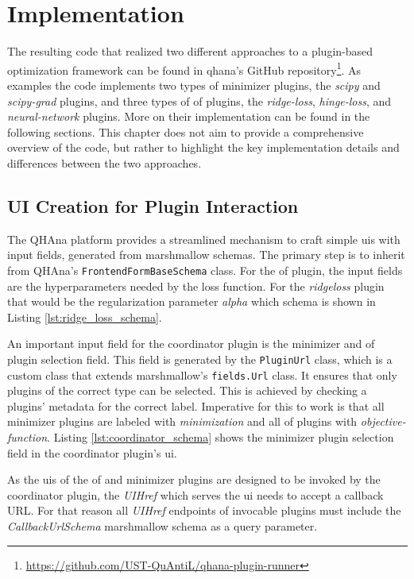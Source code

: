 \documentclass[
  a4paper,  %
  twoside,  %
  bibliography=totoc,
  headsepline,
  cleardoublepage=empty,
  parskip=half,
  draft=false
]{scrbook}
\begin{document}
\chapter{Implementation}
\label{chap:implementation}

The resulting code that realized two different approaches to a plugin-based optimization framework can be found in \gls{qhana}'s GitHub repository\footnote{\url{https://github.com/UST-QuAntiL/qhana-plugin-runner}}.
As examples the code implements two types of minimizer plugins, the \emph{scipy} and \emph{scipy-grad} plugins, and three types of \gls{of} plugins, the \emph{ridge-loss}, \emph{hinge-loss}, and \emph{neural-network} plugins.
More on their implementation can be found in the following sections.
This chapter does not aim to provide a comprehensive overview of the code, but rather to highlight the key implementation details and differences between the two approaches.


\section{UI Creation for Plugin Interaction}
\label{sec:uiCreationForPluginInteraction}
The QHAna platform provides a streamlined mechanism to craft simple \glspl{ui} with input fields, generated from marshmallow schemas.
The primary step is to inherit from QHAna's \texttt{FrontendFormBaseSchema} class.
For the \gls{of} plugin, the input fields are the hyperparameters needed by the loss function.
For the \emph{ridge\-loss} plugin that would be the regularization parameter \emph{alpha} which schema is shown in Listing \ref{lst:ridge_loss_schema}.

An important input field for the coordinator plugin is the minimizer and \gls{of} plugin selection field.
This field is generated by the \texttt{PluginUrl} class, which is a custom class that extends marshmallow's \texttt{fields.Url} class.
It ensures that only plugins of the correct type can be selected.
This is achieved by checking a plugins' metadata for the correct label.
Imperative for this to work is that all minimizer plugins are labeled with \emph{minimization} and all \gls{of} plugins with \emph{objective-function}.
Listing \ref{lst:coordinator_schema} shows the minimizer plugin selection field in the coordinator plugin's \gls{ui}.

As the \glspl{ui} of the \gls{of} and minimizer plugins are designed to be invoked by the coordinator plugin, the \emph{UIHref} which serves the \gls{ui} needs to accept a callback URL.
For that reason all \emph{UIHref} endpoints of invocable plugins must include the \emph{CallbackUrlSchema} marshmallow schema as a query parameter.
\end{document}

